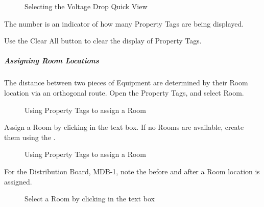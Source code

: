\documentclass[letterpaper,10pt,english]{sphinxmanual}
\begin{document}
\begin{figure}[H]
\centering
\capstart

\noindent{}
\caption{Selecting the Voltage Drop Quick View}\label{\detokenize{docs/userguide/buildingelectricalmodel/one-line/index-one-line:id19}}\end{figure}

The number is an indicator of how many Property Tags are being displayed.

Use the Clear All button to clear the display of Property Tags.


\subparagraph{Assigning Room Locations}
\label{\detokenize{docs/userguide/buildingelectricalmodel/one-line/index-one-line:assigning-room-locations}}
The distance between two pieces of Equipment are determined by their Room location via an orthogonal route.  Open the Property Tags, and select Room.

\begin{figure}[H]
\centering
\capstart

\noindent{}
\caption{Using Property Tags to assign a Room}\label{\detokenize{docs/userguide/buildingelectricalmodel/one-line/index-one-line:id20}}\end{figure}

Assign a Room by clicking in the text box.  If no Rooms are available, create them using the {\hyperref[\detokenize{docs/userguide/index-user_guide:architectural-workspaces}]{}}.

\begin{figure}[H]
\centering
\capstart

\noindent{}
\caption{Using Property Tags to assign a Room}\label{\detokenize{docs/userguide/buildingelectricalmodel/one-line/index-one-line:id21}}\end{figure}

For the Distribution Board, MDB-1, note the {\hyperref[\detokenize{docs/userguide/index-user_guide:calculated-length}]{}} before and after a Room location is assigned.

\begin{figure}[H]
\centering
\capstart

\noindent{}
\caption{Select a Room by clicking in the text box}\label{\detokenize{docs/userguide/buildingelectricalmodel/one-line/index-one-line:id22}}\end{figure}
\end{document}
